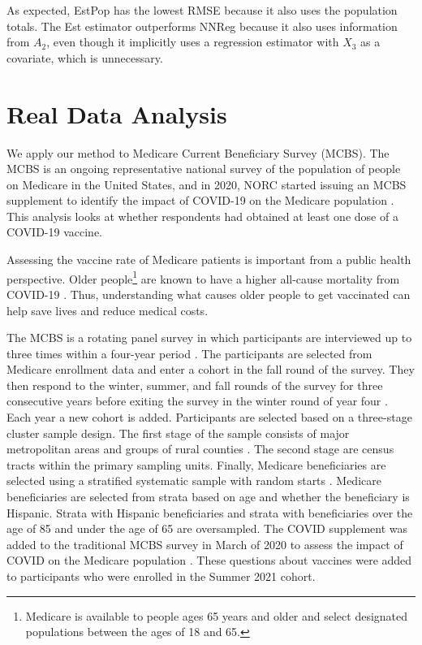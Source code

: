 \documentclass[12pt]{article}
\begin{document}
As expected, EstPop has the lowest RMSE because it also uses the population
totals. The Est estimator outperforms
NNReg because it also uses information from $A_2$, even though it implicitly
uses a regression estimator with $X_3$ as a covariate, which is unnecessary.

\section{Real Data Analysis}

We apply our method to Medicare Current Beneficiary Survey (MCBS). The MCBS
is an ongoing representative national survey of the population of people on
Medicare in the United States, and in 2020, NORC started issuing an MCBS
supplement to identify the impact of COVID-19 on the Medicare population
\citep{norc2020mcbs}. This analysis looks at whether
respondents had obtained at least one dose of a COVID-19 vaccine.

Assessing the vaccine rate of Medicare patients is important from a public
health perspective. Older people\footnote{Medicare is available to people ages
65 years and older and select designated populations between the ages of 18 and
65.}
are known to have a higher all-cause mortality from
COVID-19 \citep{bonanad2020effect}. Thus, understanding what causes older people
to get vaccinated can help save lives and reduce medical costs.

The MCBS is a rotating panel survey in which participants are interviewed up to
three times within a four-year period \citep{cms2021mcbs}. The participants
are selected from Medicare enrollment data and enter a cohort in the fall round
of the survey. They then respond to the winter, summer,
and fall rounds of the survey for three consecutive years before exiting the
survey in the winter round of year four \citep{cms2021mcbs}. Each year a new
cohort is added. Participants are selected based on a three-stage cluster sample
design. The first stage of the sample consists of major metropolitan areas and
groups of rural counties \citep{cms2021mcbs}. The second stage are census
tracts within the primary sampling units. Finally, Medicare beneficiaries are
selected using a stratified systematic sample with random starts 
\citep{cms2021mcbs}. Medicare beneficiaries are selected from strata based on
age and whether the beneficiary is Hispanic. Strata with Hispanic beneficiaries
and strata with beneficiaries over the age of 85 and under the age of 65 are
oversampled.
The COVID supplement was added to the traditional MCBS survey in March of
2020 to assess the impact of COVID on the Medicare
population \citep{cms2021covid}. These questions about vaccines were added to
participants who were enrolled in the Summer 2021 cohort.
\end{document}
